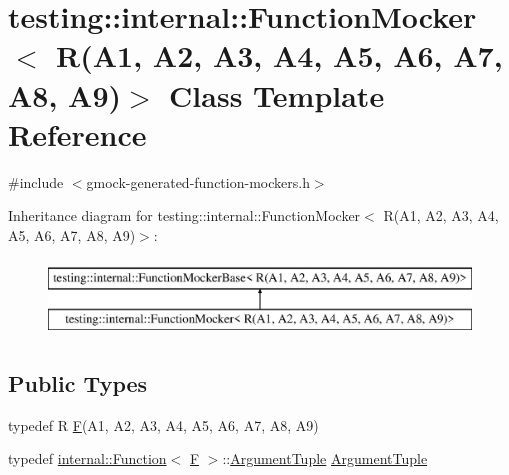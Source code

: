 \hypertarget{classtesting_1_1internal_1_1_function_mocker_3_01_r_07_a1_00_01_a2_00_01_a3_00_01_a4_00_01_a5_00d00d8722bf1ad86ca8049508f133d393}{}\section{testing\+::internal\+::Function\+Mocker$<$ R(A1, A2, A3, A4, A5, A6, A7, A8, A9)$>$ Class Template Reference}
\label{classtesting_1_1internal_1_1_function_mocker_3_01_r_07_a1_00_01_a2_00_01_a3_00_01_a4_00_01_a5_00d00d8722bf1ad86ca8049508f133d393}


{\ttfamily \#include $<$gmock-\/generated-\/function-\/mockers.\+h$>$}

Inheritance diagram for testing\+::internal\+::Function\+Mocker$<$ R(A1, A2, A3, A4, A5, A6, A7, A8, A9)$>$\+:\begin{figure}[H]
\begin{center}
\leavevmode
\includegraphics[height=2.000000cm]{d1/d70/classtesting_1_1internal_1_1_function_mocker_3_01_r_07_a1_00_01_a2_00_01_a3_00_01_a4_00_01_a5_00d00d8722bf1ad86ca8049508f133d393}
\end{center}
\end{figure}
\subsection*{Public Types}
\begin{DoxyCompactItemize}
\item 
typedef R \mbox{\hyperlink{classtesting_1_1internal_1_1_function_mocker_3_01_r_07_a1_00_01_a2_00_01_a3_00_01_a4_00_01_a5_00d00d8722bf1ad86ca8049508f133d393_a8de64ec5559bd4e4410a4374e9c93e4e}{F}}(A1, A2, A3, A4, A5, A6, A7, A8, A9)
\item 
typedef \mbox{\hyperlink{structtesting_1_1internal_1_1_function}{internal\+::\+Function}}$<$ \mbox{\hyperlink{classtesting_1_1internal_1_1_function_mocker_3_01_r_07_a1_00_01_a2_00_01_a3_00_01_a4_00_01_a5_00d00d8722bf1ad86ca8049508f133d393_a8de64ec5559bd4e4410a4374e9c93e4e}{F}} $>$\+::\mbox{\hyperlink{classtesting_1_1internal_1_1_function_mocker_3_01_r_07_a1_00_01_a2_00_01_a3_00_01_a4_00_01_a5_00d00d8722bf1ad86ca8049508f133d393_afcb802dfc6e26a318bd0599846bff218}{Argument\+Tuple}} \mbox{\hyperlink{classtesting_1_1internal_1_1_function_mocker_3_01_r_07_a1_00_01_a2_00_01_a3_00_01_a4_00_01_a5_00d00d8722bf1ad86ca8049508f133d393_afcb802dfc6e26a318bd0599846bff218}{Argument\+Tuple}}
\end{DoxyCompactItemize}

